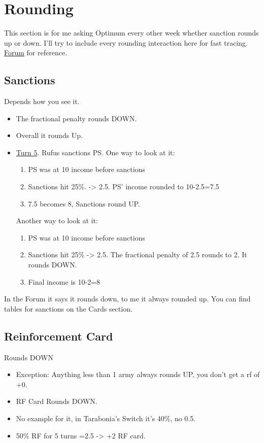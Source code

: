 \section{Rounding}

This section is for me asking Optimum every other week whether sanction rounds up or down.  I'll try to include every rounding interaction here for fast tracing. \href{https://www.warzone.com/Forum/230870-rounding-5-reference}{Forum} for reference.

\subsection{Sanctions}

Depends how you see it.

\begin{itemize}
    \item The fractional penalty rounds DOWN.
    \item Overall it rounds Up.
    \item \href{https://www.warzone.com/MultiPlayer?GameID=36855257}{Turn 5}. Rufus sanctions PS.
    One way to look at it:
    \begin{enumerate}
        \item PS was at 10 income before sanctions
        \item Sanctions hit 25\%. -> 2.5. PS' income rounded to 10-2.5=7.5
        \item 7.5 becomes 8, Sanctions round UP.
    \end{enumerate}
    Another way to look at it:
    \begin{enumerate}
        \item PS was at 10 income before sanctions
        \item Sanctions hit 25\% -> 2.5. The fractional penalty of 2.5 rounds to 2. It rounds DOWN.
        \item Final income is 10-2=8
    \end{enumerate}
\end{itemize}

In the Forum it says it rounds down, to me it always rounded up. You can find tables for sanctions on the Cards section.

\subsection{Reinforcement Card}

Rounds DOWN

\begin{itemize}
    \item Exception: Anything less than 1 army always rounds UP, you don't get a rf of +0.
    \item RF Card Rounds DOWN.
    \item No example for it, in Tarabonia's Switch it's 40\%, no 0.5.
    \item 50\% RF for 5 turns =2.5 -> +2 RF card.
\end{itemize}

